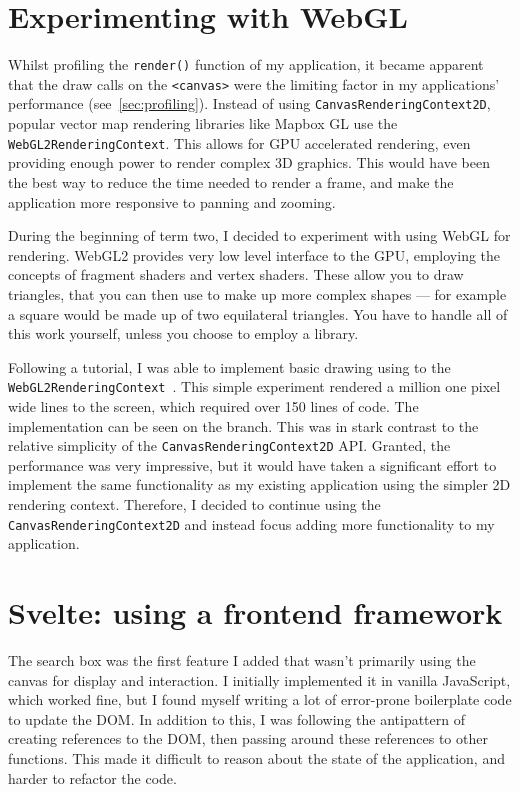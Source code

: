 \documentclass[hyphens]{final_report}
\begin{document}
\section{Experimenting with WebGL}

Whilst profiling the \texttt{render()} function of my application, it became apparent that the draw calls on the \texttt{<canvas>} were the limiting factor in my applications' performance (see~\ref{sec:profiling}). Instead of using \texttt{CanvasRenderingContext2D}, popular vector map rendering libraries like Mapbox GL use the \texttt{WebGL2RenderingContext}. This allows for GPU accelerated rendering, even providing enough power to render complex 3D graphics. This would have been the best way to reduce the time needed to render a frame, and make the application more responsive to panning and zooming.

During the beginning of term two, I decided to experiment with using WebGL for rendering. WebGL2 provides very low level interface to the GPU, employing the concepts of fragment shaders and vertex shaders. These allow you to draw triangles, that you can then use to make up more complex shapes --- for example a square would be made up of two equilateral triangles. You have to handle all of this work yourself, unless you choose to employ a library.

Following a tutorial, I was able to implement basic drawing using to the \texttt{WebGL2\-Rendering\-Context}~\cite{webglf2undamentals}. This simple experiment rendered a million one pixel wide lines to the screen, which required over 150 lines of code. The implementation can be seen on the \href{https://gitlab.cim.rhul.ac.uk/zhac152/PROJECT/-/blob/feat/web-gl/final-deliverable/src/map/map.ts#L87}{} branch. This was in stark contrast to the relative simplicity of the \texttt{CanvasRenderingContext2D} API\@. Granted, the performance was very impressive, but it would have taken a significant effort to implement the same functionality as my existing application using the simpler 2D rendering context. Therefore, I decided to continue using the \texttt{CanvasRenderingContext2D} and instead focus adding more functionality to my application.

\section{Svelte: using a frontend framework}

The search box was the first feature I added that wasn't primarily using the canvas for display and interaction. I initially implemented it in vanilla JavaScript, which worked fine, but I found myself writing a lot of error-prone boilerplate code to update the DOM\@. In addition to this, I was following the antipattern of creating references to the DOM, then passing around these references to other functions. This made it difficult to reason about the state of the application, and harder to refactor the code.
\end{document}

